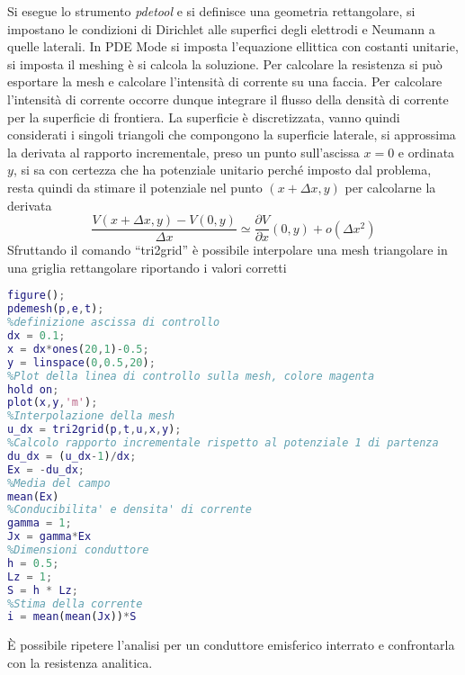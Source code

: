 Si esegue lo strumento \textit{pdetool} e si definisce una geometria rettangolare,
si impostano le condizioni di Dirichlet alle superfici degli elettrodi e Neumann a quelle 
laterali.
In PDE Mode si imposta l'equazione ellittica con costanti unitarie, si imposta il meshing
è si calcola la soluzione.
Per calcolare la resistenza si può esportare la mesh e calcolare l'intensità di corrente su 
una faccia.
Per calcolare l'intensità di corrente occorre dunque integrare il flusso della densità
di corrente per la superficie di frontiera.
La superficie è discretizzata, vanno quindi considerati i singoli triangoli
che compongono la superficie laterale, si approssima la derivata al rapporto incrementale,
preso un punto sull'ascissa $x=0$ e ordinata $y$, si sa con certezza che ha potenziale 
unitario perché imposto dal problema, resta quindi da stimare il potenziale nel 
punto $(x+\Delta x,y)$ per calcolarne la derivata
$$
\frac{V(x+\Delta x,y) - V (0,y)}{\Delta x}\simeq \frac{\partial V}{\partial x} (0,y) +o(\Delta x^2)
$$
Sfruttando il comando ``tri2grid'' è possibile interpolare una mesh triangolare
in una griglia rettangolare riportando i valori corretti
\begin{lstlisting}[style=Matlab-editor,language = Matlab]
%plot mesh
figure();
pdemesh(p,e,t);
%definizione ascissa di controllo
dx = 0.1;
x = dx*ones(20,1)-0.5;
y = linspace(0,0.5,20);
%Plot della linea di controllo sulla mesh, colore magenta
hold on;
plot(x,y,'m');
%Interpolazione della mesh
u_dx = tri2grid(p,t,u,x,y);
%Calcolo rapporto incrementale rispetto al potenziale 1 di partenza
du_dx = (u_dx-1)/dx;
Ex = -du_dx;
%Media del campo
mean(Ex)
%Conducibilita' e densita' di corrente
gamma = 1;
Jx = gamma*Ex
%Dimensioni conduttore
h = 0.5;
Lz = 1;
S = h * Lz;
%Stima della corrente
i = mean(mean(Jx))*S
\end{lstlisting}
È possibile ripetere l'analisi per un conduttore emisferico interrato e confrontarla
con la resistenza analitica.
